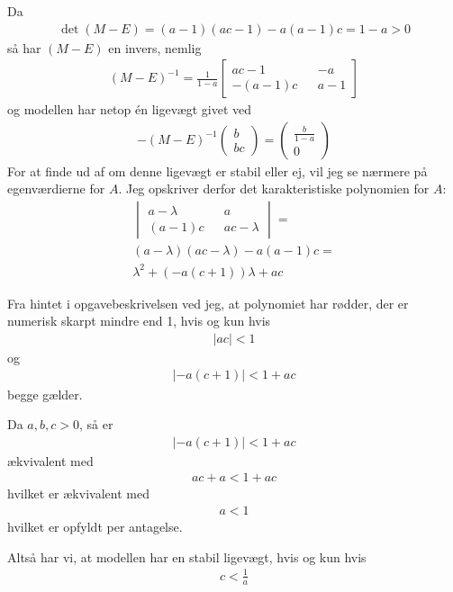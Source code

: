 \documentclass[12pt]{article}
\begin{document}
Da 
\begin{align}
\det (M - E) = (a-1)(ac-1) - a(a-1)c = 1-a > 0
\end{align}
så har $(M-E)$ en invers, nemlig
\begin{align}
(M-E)^{-1} = \frac{1}{1-a} \begin{bmatrix}
ac-1 && -a \\
-(a-1)c && a - 1
\end{bmatrix}
\end{align}
og modellen har netop én ligevægt givet ved
\begin{align}
-(M-E)^{-1}\begin{pmatrix}
b\\
bc
\end{pmatrix} =
\begin{pmatrix}
\frac{b}{1-a}\\
0
\end{pmatrix}
\end{align}
For at finde ud af om denne ligevægt er stabil eller ej, vil jeg se nærmere på egenværdierne for $A$. Jeg opskriver derfor det karakteristiske polynomien for $A$:
\begin{align}
\begin{vmatrix}
a - \lambda && a \\
(a-1)c && ac - \lambda
\end{vmatrix} = \\
(a-\lambda)(ac - \lambda) - a(a-1)c =\\ 
\lambda^2 + (-a(c+1))\lambda + ac
\end{align}

Fra hintet i opgavebeskrivelsen ved jeg, at polynomiet har rødder, der er numerisk skarpt mindre end 1, hvis og kun hvis
\begin{align}
|ac| < 1
\end{align}
og
\begin{align}
|-a(c+1)| < 1 + ac
\end{align}
begge gælder.

Da $a,b,c>0$, så er
\begin{align}
|-a(c+1)| < 1 + ac
\end{align}
ækvivalent med
\begin{align}
ac+a < 1 + ac
\end{align}
hvilket er ækvivalent med
\begin{align}
a < 1
\end{align}
hvilket er opfyldt per antagelse. 

Altså har vi, at modellen har en stabil ligevægt, hvis og kun hvis
\begin{align}
c < \frac{1}{a}
\end{align}
\end{document}

